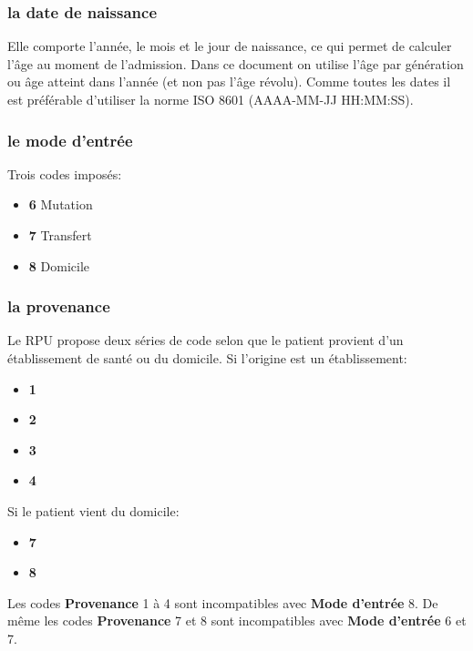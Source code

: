 \documentclass[12pt,english,french,twoside]{book}\usepackage[]{graphicx}\usepackage[]{color}
\begin{document}
\subsubsection{la date de naissance}

Elle comporte l'année, le mois et le jour de naissance, ce qui permet de calculer l'âge au moment de l'admission. Dans ce document on utilise l'âge par génération ou âge atteint dans l'année (et non pas l'âge révolu). Comme toutes les dates il est préférable d'utiliser la norme ISO 8601 (AAAA-MM-JJ HH:MM:SS).

\subsubsection{le mode d'entrée}

Trois codes imposés:
\begin{itemize}
  \item \textbf{6} Mutation
  \item \textbf{7} Transfert
  \item \textbf{8} Domicile
\end{itemize}


\subsubsection{la provenance}

Le RPU propose deux séries de code selon que le patient provient d'un établissement de santé ou du domicile. Si l'origine est un établissement:
\begin{itemize}
  \item \textbf{1}
  \item \textbf{2}
  \item \textbf{3}
  \item \textbf{4}
\end{itemize}
Si le patient vient du domicile:
\begin{itemize}
  \item \textbf{7}
  \item \textbf{8}
\end{itemize}

Les codes \textbf{Provenance} 1 à 4 sont incompatibles avec \textbf{Mode d'entrée} 8. De même les codes \textbf{Provenance} 7 et 8 sont incompatibles avec \textbf{Mode d'entrée} 6 et 7.
\end{document}
